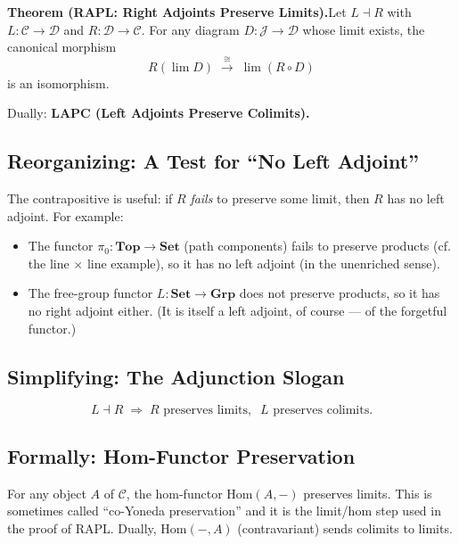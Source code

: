 \textbf{Theorem (RAPL: Right Adjoints Preserve Limits).}\quad Let
$L \dashv R$ with $L : \mathcal{C} \to \mathcal{D}$ and $R : \mathcal{D}
\to \mathcal{C}$. For any diagram $D : \mathcal{J} \to \mathcal{D}$ whose
limit exists, the canonical morphism
\begin{equation*}
  R(\lim D) \;\xrightarrow{\;\cong\;}\; \lim (R \circ D)
\end{equation*}
is an isomorphism.

Dually: \textbf{LAPC (Left Adjoints Preserve Colimits).}

\subsection{Reorganizing: A Test for ``No Left Adjoint''}

The contrapositive is useful: if $R$ \emph{fails} to preserve some limit,
then $R$ has no left adjoint. For example:
\begin{itemize}
  \item The functor $\pi_0 : \mathbf{Top} \to \mathbf{Set}$ (path
        components) fails to preserve products (cf. the line $\times$
        line example), so it has no left adjoint (in the unenriched
        sense).
  \item The free-group functor $L : \mathbf{Set} \to \mathbf{Grp}$ does
        not preserve products, so it has no right adjoint either. (It is
        itself a left adjoint, of course --- of the forgetful functor.)
\end{itemize}

\subsection{Simplifying: The Adjunction Slogan}

\begin{equation*}
  \boxed{\;\;
    L \dashv R
    \;\Rightarrow\;
    R \text{ preserves limits},\;\;
    L \text{ preserves colimits}.
  \;\;}
\end{equation*}

\subsection{Formally: Hom-Functor Preservation}

For any object $A$ of $\mathcal{C}$, the hom-functor
$\mathrm{Hom}(A, -)$ preserves limits. This is sometimes called
``co-Yoneda preservation'' and it is the limit/hom step used in the
proof of RAPL. Dually, $\mathrm{Hom}(-, A)$ (contravariant) sends
colimits to limits.


